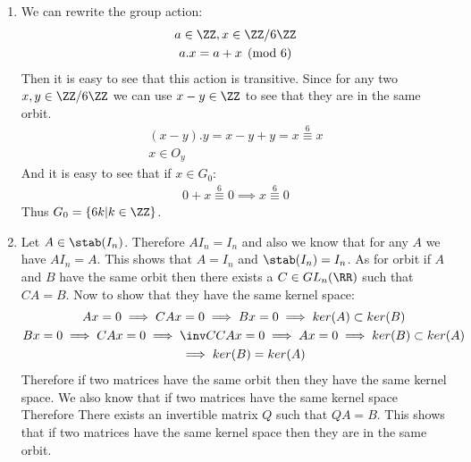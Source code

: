 \begin{enumerate}[label=\textbf{(\textit{\roman*})}]
    \item 
        We can rewrite the group action:
        \begin{gather*}
            a \in \ZZ, x \in \ZZ / 6\ZZ \\
            a.x = a + x \pmod 6
        \end{gather*}
        Then it is easy to see that this action is transitive. Since for any two $x, y \in \ZZ / 6\ZZ$ we can use $x - y \in \ZZ$ to see that they are in the same orbit.
        \begin{gather*}
            (x - y).y = x - y + y = x \overset{6}{\equiv} x \\
            x \in O_y 
        \end{gather*}
        And it is easy to see that if $x \in G_0$:
        \begin{gather*}
            0 + x \overset{6}{\equiv} 0 \implies x \overset{6}{\equiv} 0
        \end{gather*}
        Thus $G_0=\{6k| k \in \ZZ\}$.
    \item  
        Let $A \in \stab(I_n)$. Therefore $AI_n = I_n$ and also we know that for any $A$ we have $AI_n = A$. This shows that $A = I_n$ and $\stab(I_n) = I_n$. \newline
        As for orbit if $A$ and $B$ have the same orbit then there exists a $C \in GL_n(\RR)$ such that $CA = B$. Now to show that they have the same kernel space:
        \begin{gather*}
            Ax = 0 \implies CAx = 0 \implies Bx = 0 \implies ker(A) \subset ker(B) \\
            Bx = 0 \implies CAx = 0 \implies \inv C CAx = 0 \implies Ax = 0 \implies ker(B) \subset ker(A) \\
            \implies ker(B) = ker(A)
        \end{gather*}
        Therefore if two matrices have the same orbit then they have the same kernel space.
        We also know that if two matrices have the same kernel space Therefore There exists an invertible matrix $Q$ such that $QA = B$. This shows that if two matrices have the same kernel space then they are in the same orbit.
\end{enumerate}